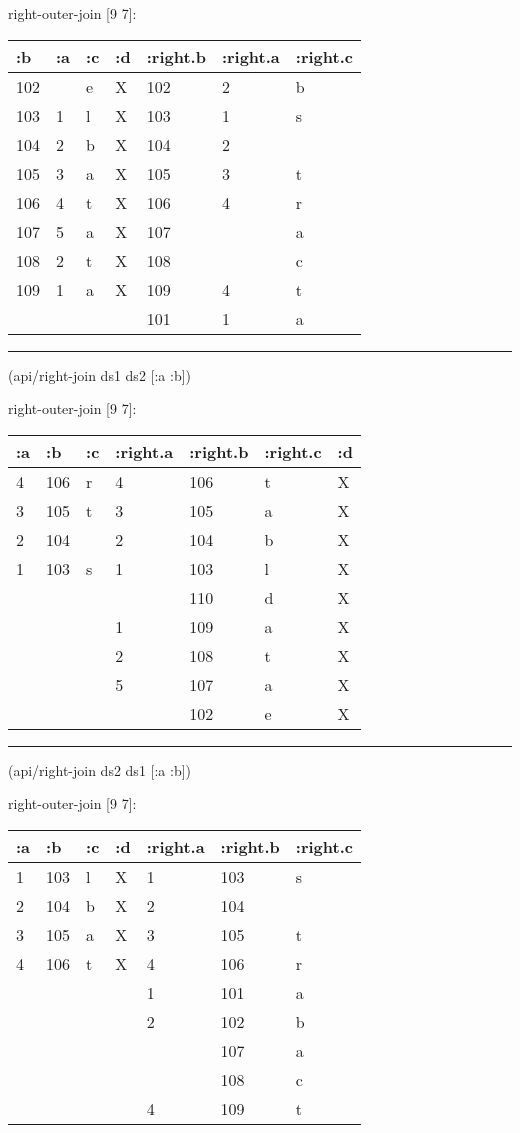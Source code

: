 \documentclass[]{article}
\newenvironment{Shaded}{\begin{snugshade}}{\end{snugshade}}
\newcommand{\AttributeTok}[1]{\textcolor[rgb]{0.77,0.63,0.00}{#1}}
\newcommand{\NormalTok}[1]{#1}
\begin{document}
right-outer-join {[}9 7{]}:

\begin{longtable}[]{@{}lllllll@{}}
\toprule
:b & :a & :c & :d & :right.b & :right.a & :right.c\tabularnewline
\midrule
\endhead
102 & & e & X & 102 & 2 & b\tabularnewline
103 & 1 & l & X & 103 & 1 & s\tabularnewline
104 & 2 & b & X & 104 & 2 &\tabularnewline
105 & 3 & a & X & 105 & 3 & t\tabularnewline
106 & 4 & t & X & 106 & 4 & r\tabularnewline
107 & 5 & a & X & 107 & & a\tabularnewline
108 & 2 & t & X & 108 & & c\tabularnewline
109 & 1 & a & X & 109 & 4 & t\tabularnewline
& & & & 101 & 1 & a\tabularnewline
\bottomrule
\end{longtable}

\begin{center}\rule{0.5\linewidth}{0.5pt}\end{center}

\begin{Shaded}
\begin{Highlighting}[]
\NormalTok{(api/right-join ds1 ds2 [}\AttributeTok{:a} \AttributeTok{:b}\NormalTok{])}
\end{Highlighting}
\end{Shaded}

right-outer-join {[}9 7{]}:

\begin{longtable}[]{@{}lllllll@{}}
\toprule
:a & :b & :c & :right.a & :right.b & :right.c & :d\tabularnewline
\midrule
\endhead
4 & 106 & r & 4 & 106 & t & X\tabularnewline
3 & 105 & t & 3 & 105 & a & X\tabularnewline
2 & 104 & & 2 & 104 & b & X\tabularnewline
1 & 103 & s & 1 & 103 & l & X\tabularnewline
& & & & 110 & d & X\tabularnewline
& & & 1 & 109 & a & X\tabularnewline
& & & 2 & 108 & t & X\tabularnewline
& & & 5 & 107 & a & X\tabularnewline
& & & & 102 & e & X\tabularnewline
\bottomrule
\end{longtable}

\begin{center}\rule{0.5\linewidth}{0.5pt}\end{center}

\begin{Shaded}
\begin{Highlighting}[]
\NormalTok{(api/right-join ds2 ds1 [}\AttributeTok{:a} \AttributeTok{:b}\NormalTok{])}
\end{Highlighting}
\end{Shaded}

right-outer-join {[}9 7{]}:

\begin{longtable}[]{@{}lllllll@{}}
\toprule
:a & :b & :c & :d & :right.a & :right.b & :right.c\tabularnewline
\midrule
\endhead
1 & 103 & l & X & 1 & 103 & s\tabularnewline
2 & 104 & b & X & 2 & 104 &\tabularnewline
3 & 105 & a & X & 3 & 105 & t\tabularnewline
4 & 106 & t & X & 4 & 106 & r\tabularnewline
& & & & 1 & 101 & a\tabularnewline
& & & & 2 & 102 & b\tabularnewline
& & & & & 107 & a\tabularnewline
& & & & & 108 & c\tabularnewline
& & & & 4 & 109 & t\tabularnewline
\bottomrule
\end{longtable}
\end{document}

